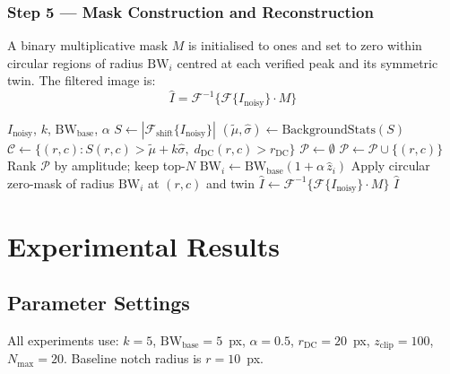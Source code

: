 \documentclass[conference,a4paper]{IEEEtran}
\begin{document}
\subsubsection{Step 5 — Mask Construction and Reconstruction}

A binary multiplicative mask $M$ is initialised to ones and set to zero within circular regions of radius $\mathrm{BW}_i$ centred at each verified peak and its symmetric twin. The filtered image is:
\begin{equation}
  \hat{I} = \mathcal{F}^{-1}\!\bigl\{\mathcal{F}\{I_\text{noisy}\} \cdot M\bigr\}
  \label{eq:filter}
\end{equation}

\begin{algorithm}[t]
\caption{Adaptive Notch Filter}\label{alg:anf}
\begin{algorithmic}[1]
  \Require $I_\text{noisy}$, $k$, $\mathrm{BW}_\text{base}$, $\alpha$
  \State $S \leftarrow |\mathcal{F}_\text{shift}\{I_\text{noisy}\}|$
  \State $(\tilde\mu,\hat\sigma) \leftarrow \text{BackgroundStats}(S)$
  \State $\mathcal{C} \leftarrow \{(r,c) : S(r,c) > \tilde\mu + k\hat\sigma,\; d_\text{DC}(r,c) > r_\text{DC}\}$
  \State $\mathcal{P} \leftarrow \emptyset$
   
      \State $\mathcal{P} \leftarrow \mathcal{P} \cup \{(r,c)\}$
    \EndIf
  \EndFor
  \State Rank $\mathcal{P}$ by amplitude; keep top-$N$
    \State $\mathrm{BW}_i \leftarrow \mathrm{BW}_\text{base}(1 + \alpha\,\widehat{z}_i)$ 
    \State Apply circular zero-mask of radius $\mathrm{BW}_i$ at $(r,c)$ and twin
  \EndFor
  \State $\hat{I} \leftarrow \mathcal{F}^{-1}\{\mathcal{F}\{I_\text{noisy}\}\cdot M\}$
  \State \Return $\hat{I}$
\end{algorithmic}
\end{algorithm}

\section{Experimental Results}
\label{sec:results}

\subsection{Parameter Settings}

All experiments use: $k=5$, $\mathrm{BW}_\text{base}=5$~px, $\alpha=0.5$, $r_\text{DC}=20$~px, $z_\text{clip}=100$, $N_\text{max}=20$. Baseline notch radius is $r=10$~px.
\end{document}
